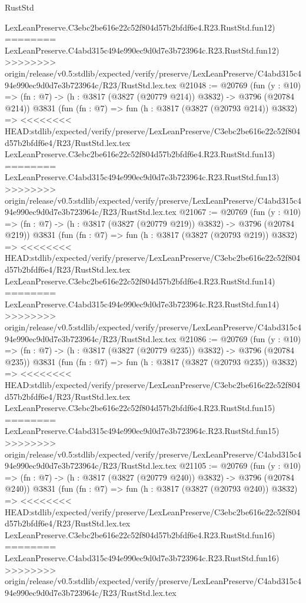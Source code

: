 \begin{lexlean}{RustStd}
\begin{coremodule}
{\begin{coremodule}
{{{{{{{{{{{{{{{{{{{{{{{{{{{{{{{{{{{    LexLeanPreserve.C3ebc2be616e22c52f804d57b2bfdf6e4.R23.RustStd.fun12)
========
    LexLeanPreserve.C4abd315c494e990ec9d0d7e3b723964c.R23.RustStd.fun12)
>>>>>>>> origin/release/v0.5:stdlib/expected/verify/preserve/LexLeanPreserve/C4abd315c494e990ec9d0d7e3b723964c/R23/RustStd.lex.tex
@21048 := @20769
    (fun (y : @10) => (fn : @7) -> (h : @3817 (@3827 (@20779 @214)) @3832) -> @3796 (@20784 @214))
    @3831
    (fun (fn : @7) =>
    fun (h : @3817 (@3827 (@20793 @214)) @3832) =>
<<<<<<<< HEAD:stdlib/expected/verify/preserve/LexLeanPreserve/C3ebc2be616e22c52f804d57b2bfdf6e4/R23/RustStd.lex.tex
    LexLeanPreserve.C3ebc2be616e22c52f804d57b2bfdf6e4.R23.RustStd.fun13)
========
    LexLeanPreserve.C4abd315c494e990ec9d0d7e3b723964c.R23.RustStd.fun13)
>>>>>>>> origin/release/v0.5:stdlib/expected/verify/preserve/LexLeanPreserve/C4abd315c494e990ec9d0d7e3b723964c/R23/RustStd.lex.tex
@21067 := @20769
    (fun (y : @10) => (fn : @7) -> (h : @3817 (@3827 (@20779 @219)) @3832) -> @3796 (@20784 @219))
    @3831
    (fun (fn : @7) =>
    fun (h : @3817 (@3827 (@20793 @219)) @3832) =>
<<<<<<<< HEAD:stdlib/expected/verify/preserve/LexLeanPreserve/C3ebc2be616e22c52f804d57b2bfdf6e4/R23/RustStd.lex.tex
    LexLeanPreserve.C3ebc2be616e22c52f804d57b2bfdf6e4.R23.RustStd.fun14)
========
    LexLeanPreserve.C4abd315c494e990ec9d0d7e3b723964c.R23.RustStd.fun14)
>>>>>>>> origin/release/v0.5:stdlib/expected/verify/preserve/LexLeanPreserve/C4abd315c494e990ec9d0d7e3b723964c/R23/RustStd.lex.tex
@21086 := @20769
    (fun (y : @10) => (fn : @7) -> (h : @3817 (@3827 (@20779 @235)) @3832) -> @3796 (@20784 @235))
    @3831
    (fun (fn : @7) =>
    fun (h : @3817 (@3827 (@20793 @235)) @3832) =>
<<<<<<<< HEAD:stdlib/expected/verify/preserve/LexLeanPreserve/C3ebc2be616e22c52f804d57b2bfdf6e4/R23/RustStd.lex.tex
    LexLeanPreserve.C3ebc2be616e22c52f804d57b2bfdf6e4.R23.RustStd.fun15)
========
    LexLeanPreserve.C4abd315c494e990ec9d0d7e3b723964c.R23.RustStd.fun15)
>>>>>>>> origin/release/v0.5:stdlib/expected/verify/preserve/LexLeanPreserve/C4abd315c494e990ec9d0d7e3b723964c/R23/RustStd.lex.tex
@21105 := @20769
    (fun (y : @10) => (fn : @7) -> (h : @3817 (@3827 (@20779 @240)) @3832) -> @3796 (@20784 @240))
    @3831
    (fun (fn : @7) =>
    fun (h : @3817 (@3827 (@20793 @240)) @3832) =>
<<<<<<<< HEAD:stdlib/expected/verify/preserve/LexLeanPreserve/C3ebc2be616e22c52f804d57b2bfdf6e4/R23/RustStd.lex.tex
    LexLeanPreserve.C3ebc2be616e22c52f804d57b2bfdf6e4.R23.RustStd.fun16)
========
    LexLeanPreserve.C4abd315c494e990ec9d0d7e3b723964c.R23.RustStd.fun16)
>>>>>>>> origin/release/v0.5:stdlib/expected/verify/preserve/LexLeanPreserve/C4abd315c494e990ec9d0d7e3b723964c/R23/RustStd.lex.tex
}}}}}}}}}}}}}}}}}}}}}}}}}}}}}}}}}}}
\end{coremodule}}
\end{coremodule}
\end{lexlean}
